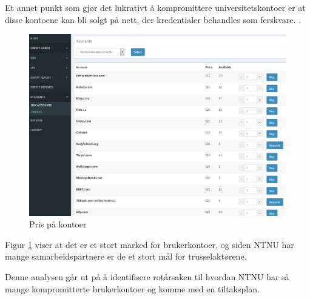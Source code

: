 Et annet punkt som gjør det lukrativt å kompromittere universitetskontoer er at disse kontoene kan bli solgt på nett, der kredentialer behandles som ferskvare. \cite{PrisKonto}. 
\begin{figure}[H]
    \centering
    \includegraphics[scale=0.3]{case_2/bilder/prislite_kontore.png}
    \caption[Pris på kontoer]{Pris på kontoer}
    \label{fig:pris-kontoer}
\end{figure}

Figur \ref{fig:pris-kontoer} viser at det er et stort marked for brukerkontoer, og siden NTNU har mange samarbeidspartnere er de et stort mål for trusselaktørene. 

Denne analysen går ut på å identifisere rotårsaken til hvordan NTNU har så mange kompromitterte brukerkontoer og komme med en tiltaksplan.